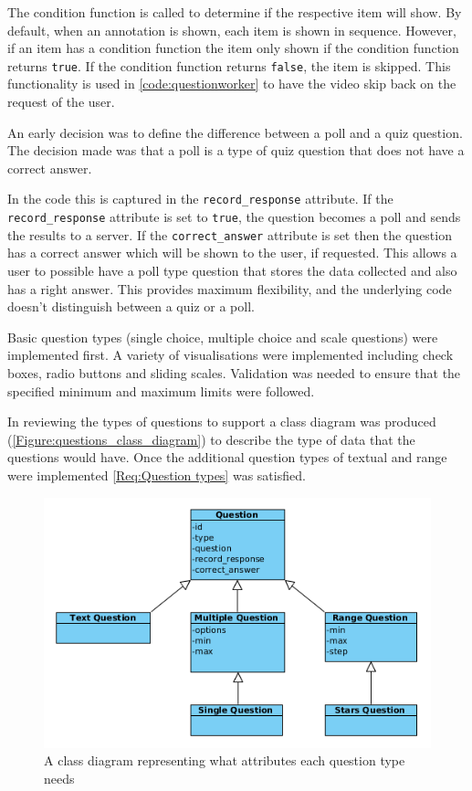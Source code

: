 The condition function is called to determine if the respective item will show. By default, when an \gls{annotation} is shown, each item is shown in sequence. However, if an item has a condition function the item only shown if the condition function returns \lstinline|true|. If the condition function returns \lstinline|false|, the item is skipped. This functionality is used in \autoref{code:questionworker} to have the video skip back on the request of the user.

An early decision was to define the difference between a poll and a quiz question. The decision made was that a poll is a type of quiz question that does not have a correct answer.

In the code this is captured in the \lstinline|record_response| attribute. If the \lstinline|record_response| attribute is set to \lstinline|true|, the question becomes a poll and sends the results to a server. If the \lstinline|correct_answer| attribute is set then the question has a correct answer which will be shown to the user, if requested. This allows a user to possible have a poll type question that stores the data collected and also has a right answer. This provides maximum flexibility, and the underlying code doesn't distinguish between a quiz or a poll.

Basic question types (single choice, multiple choice and scale questions) were implemented first. A variety of visualisations were implemented including check boxes, radio buttons and sliding scales. Validation was needed to ensure that the specified minimum and maximum limits were followed.

In reviewing the types of questions to support a class diagram was produced (\autoref{Figure:questions_class_diagram}) to describe the type of data that the questions would have. Once the additional question types of textual and range were implemented \cref{Req:Question types} was satisfied.

\begin{figure}
	\centering
	\includegraphics[width=12cm]{../figures/questions_class_diagram.png}
	\caption{A class diagram representing what attributes each question type needs}
	\label{Figure:questions_class_diagram}
\end{figure}

